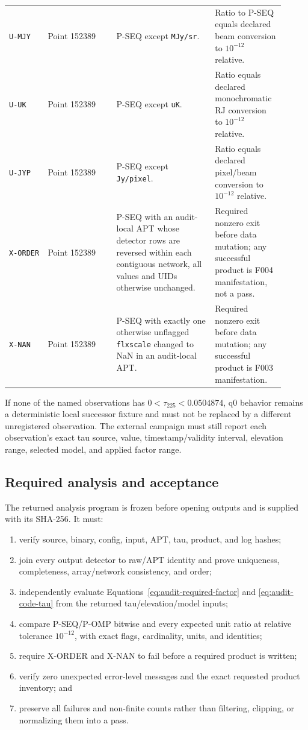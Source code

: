 \documentclass[11pt]{article}
\newcommand{\code}[1]{\nolinkurl{#1}}
\begin{document}
\begin{longtable}{L{0.13\linewidth}L{0.23\linewidth}L{0.33\linewidth}L{0.22\linewidth}}
\code{U-MJY} & Point 152389 & P-SEQ except \code{MJy/sr}. & Ratio to P-SEQ
equals declared beam conversion to \(10^{-12}\) relative.\\
\code{U-UK} & Point 152389 & P-SEQ except \code{uK}. & Ratio equals declared
monochromatic RJ conversion to \(10^{-12}\) relative.\\
\code{U-JYP} & Point 152389 & P-SEQ except \code{Jy/pixel}. & Ratio equals
declared pixel/beam conversion to \(10^{-12}\) relative.\\
\code{X-ORDER} & Point 152389 & P-SEQ with an audit-local APT whose detector
rows are reversed within each contiguous network, all values and UIDs
otherwise unchanged. & Required nonzero exit before data mutation; any
successful product is F004 manifestation, not a pass.\\
\code{X-NAN} & Point 152389 & P-SEQ with exactly one otherwise unflagged
\code{flxscale} changed to NaN in an audit-local APT. & Required nonzero exit
before data mutation; any successful product is F003 manifestation.\\
\bottomrule
\end{longtable}

If none of the named observations has
\(0<\tau_{225}<0.0504874\), q0 behavior remains a deterministic local successor
fixture and must not be replaced by a different unregistered observation.
The external campaign must still report each observation's exact tau source,
value, timestamp/validity interval, elevation range, selected model, and
applied factor range.

\subsection*{Required analysis and acceptance}

The returned analysis program is frozen before opening outputs and is supplied
with its SHA-256.  It must:
\begin{enumerate}[leftmargin=*]
\item verify source, binary, config, input, APT, tau, product, and log hashes;
\item join every output detector to raw/APT identity and prove uniqueness,
completeness, array/network consistency, and order;
\item independently evaluate Equations~\eqref{eq:audit-required-factor} and
\eqref{eq:audit-code-tau} from the returned tau/elevation/model inputs;
\item compare P-SEQ/P-OMP bitwise and every expected unit ratio at relative
tolerance \(10^{-12}\), with exact flags, cardinality, units, and identities;
\item require X-ORDER and X-NAN to fail before a required product is written;
\item verify zero unexpected error-level messages and the exact requested
product inventory; and
\item preserve all failures and non-finite counts rather than filtering,
clipping, or normalizing them into a pass.
\end{enumerate}
\end{document}
